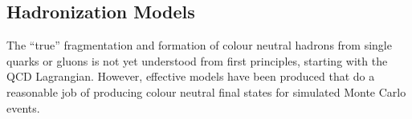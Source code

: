 \subsection{Hadronization Models} %
\label{sub:hadronization_models}
The ``true'' fragmentation and formation of colour neutral hadrons from single 
quarks or gluons is not yet understood from first principles, starting with the 
QCD Lagrangian. However, effective models have been produced that do a 
reasonable job of producing colour neutral final states for simulated Monte 
Carlo events. 


